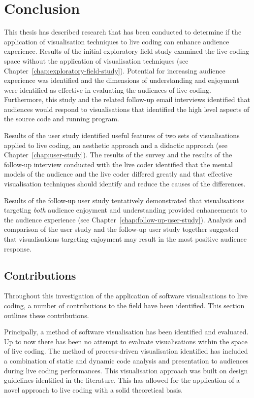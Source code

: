 
\chapter{Conclusion}
\label{chap:conclusion}

This thesis has described research that has been conducted to determine if the application of visualisation techniques to live coding can enhance audience experience. Results of the initial exploratory field study examined the live coding space without the application of visualisation techniques (see Chapter~\ref{chap:exploratory-field-study}). Potential for increasing audience experience was identified and the dimensions of understanding and enjoyment were identified as effective in evaluating the audiences of live coding. Furthermore, this study and the related follow-up email interviews identified that audiences would respond to visualisations that identified the high level aspects of the source code and running program.

Results of the user study identified useful features of two sets of visualisations applied to live coding, an aesthetic approach and a didactic approach (see Chapter~\ref{chap:user-study}). The results of the survey and the results of the follow-up interview conducted with the live coder identified that the mental models of the audience and the live coder differed greatly and that effective visualisation techniques should identify and reduce the causes of the differences.

Results of the follow-up user study tentatively demonstrated that visualisations targeting \textit{both} audience enjoyment and understanding provided enhancements to the audience experience (see Chapter~\ref{chap:follow-up-user-study}). Analysis and comparison of the user study and the follow-up user study together suggested that visualisations targeting enjoyment may result in the most positive audience response.

\section{Contributions}

Throughout this investigation of the application of software visualisations to live coding, a number of contributions to the field have been identified. This section outlines these contributions.

Principally, a method of software visualisation has been identified and evaluated. Up to now there has been no attempt to evaluate visualisations within the space of live coding. The method of process-driven visualisation identified has included a combination of static and dynamic code analysis and presentation to audiences during live coding performances. This visualisation approach was built on design guidelines identified in the literature. This has allowed for the application of a novel approach to live coding with a solid theoretical basis.

